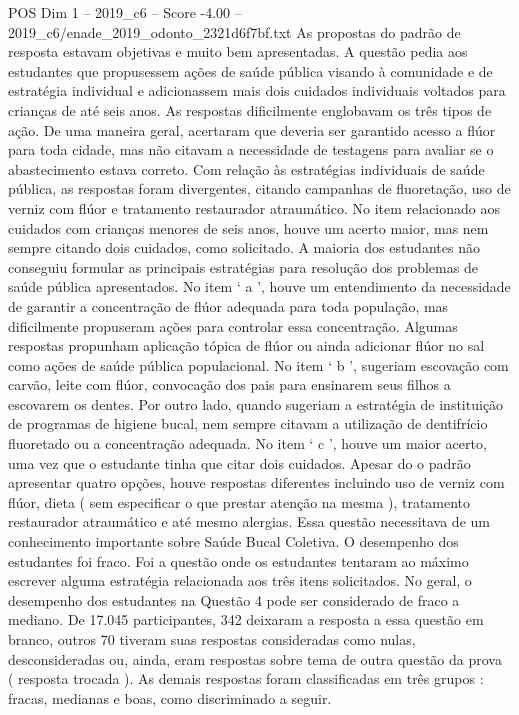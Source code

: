 \begin{textsample}{POS Dim 1 – 2019\_c6 – Score -4.00 – 2019\_c6/enade\_2019\_odonto\_2321d6f7bf.txt}
As propostas do padrão de resposta estavam objetivas e muito bem apresentadas.
A questão pedia aos estudantes que propusessem ações de saúde pública visando à comunidade e de estratégia individual e adicionassem mais dois cuidados individuais voltados para crianças de até seis anos.
As respostas dificilmente englobavam os três tipos de ação.
De uma maneira geral, acertaram que deveria ser garantido acesso a flúor para toda cidade, mas não citavam a necessidade de testagens para avaliar se o abastecimento estava correto.
Com relação às estratégias individuais de saúde pública, as respostas foram divergentes, citando campanhas de fluoretação, uso de verniz com flúor e tratamento restaurador atraumático.
No item relacionado aos cuidados com crianças menores de seis anos, houve um acerto maior, mas nem sempre citando dois cuidados, como solicitado.
A maioria dos estudantes não conseguiu formular as principais estratégias para resolução dos problemas de saúde pública apresentados.
No item ‘ a ’, houve um entendimento da necessidade de garantir a concentração de flúor adequada para toda população, mas dificilmente propuseram ações para controlar essa concentração.
Algumas respostas propunham aplicação tópica de flúor ou ainda adicionar flúor no sal como ações de saúde pública populacional.
No item ‘ b ’, sugeriam escovação com carvão, leite com flúor, convocação dos pais para ensinarem seus filhos a escovarem os dentes.
Por outro lado, quando sugeriam a estratégia de instituição de programas de higiene bucal, nem sempre citavam a utilização de dentifrício fluoretado ou a concentração adequada.
No item ‘ c ’, houve um maior acerto, uma vez que o estudante tinha que citar dois cuidados.
Apesar do o padrão apresentar quatro opções, houve respostas diferentes incluindo uso de verniz com flúor, dieta ( sem especificar o que prestar atenção na mesma ), tratamento restaurador atraumático e até mesmo alergias.
Essa questão necessitava de um conhecimento importante sobre Saúde Bucal Coletiva.
O desempenho dos estudantes foi fraco.
Foi a questão onde os estudantes tentaram ao máximo escrever alguma estratégia relacionada aos três itens solicitados.
No geral, o desempenho dos estudantes na Questão 4 pode ser considerado de fraco a mediano.
De 17.045 participantes, 342 deixaram a resposta a essa questão em branco, outros 70 tiveram suas respostas consideradas como nulas, desconsideradas ou, ainda, eram respostas sobre tema de outra questão da prova ( resposta trocada ).
As demais respostas foram classificadas em três grupos : fracas, medianas e boas, como discriminado a seguir.

\end{textsample}
